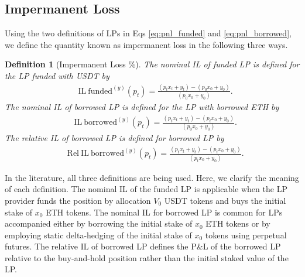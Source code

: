 \documentclass[pdftex,11pt,a4paper] {article}
\newtheorem{definition}{Definition}[section]
\begin{document}
\subsection{Impermanent Loss}

Using the two definitions of LPs in Eqs \eqref{eq:pnl_funded} and \eqref{eq:pnl_borrowed}, we define the quantity known as impermanent
loss in the following three ways.

\begin{definition}[Impermanent Loss $\%$]
\label{def:il} The nominal IL of funded LP is defined for the LP funded with
USDT by
\begin{equation}  \label{eq:il_funded}
\begin{split}
& \mathrm{IL \ funded}^{(y)}(p_{t}) = \frac{\left(p_{t} x_{t} +
y_{t}\right)-\left(p_{0}x_{0} + y_{0}\right)}{\left(p_{0}x_{0} + y_{0}\right)%
}.
\end{split}%
\end{equation}
The nominal IL of borrowed LP is defined for the LP with borrowed ETH by
\begin{equation}  \label{eq:il_borrowed_nom}
\begin{split}
& \mathrm{IL \ borrowed}^{(y)}(p_{t}) = \frac{\left(p_{t} x_{t} + y_{t} \right) -
\left(p_{t} x_{0} + y_{0}\right)}{\left(p_{0}x_{0} + y_{0}\right)}.
\end{split}%
\end{equation}
The relative IL of borrowed LP is defined for borrowed LP by
\begin{equation}  \label{eq:il_borrowed_rel}
\begin{split}
& \mathrm{Rel \ IL \ borrowed}^{(y)}(p_{t}) = \frac{\left(p_{t} x_{t} + y_{t} \right)
- \left(p_{t} x_{0} + y_{0}\right)}{\left(p_{t}x_{0} + y_{0}\right)}.
\end{split}%
\end{equation}
\end{definition}

In the literature, all three definitions are being used. Here, we clarify
the meaning of each definition. The nominal IL of the funded LP is applicable
when the LP provider funds the position by allocation $V_{0}$ USDT tokens
and buys the initial stake of $x_{0}$ ETH tokens. The nominal IL for
borrowed LP is common for LPs accompanied either by borrowing the initial
stake of $x_{0}$ ETH tokens or by employing static delta-hedging of the initial
stake of $x_{0}$ tokens using perpetual futures. The relative IL of borrowed
LP defines the P\&L of the borrowed LP relative to the buy-and-hold position
rather than the initial staked value of the LP.
\end{document}
